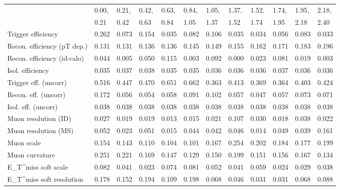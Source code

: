 \begin{tabular}{l|p{0.6cm}p{0.6cm}p{0.6cm}p{0.6cm}p{0.6cm}p{0.6cm}p{0.6cm}p{0.6cm}p{0.6cm}p{0.6cm}p{0.6cm}}
\hline
   & 0.00, & 0.21, & 0.42, & 0.63, & 0.84, & 1.05, & 1.37, & 1.52, & 1.74, & 1.95, & 2.18,  \\ 
   & 0.21 & 0.42 & 0.63 & 0.84 & 1.05 & 1.37 & 1.52 & 1.74 & 1.95 & 2.18 & 2.40  \\ 
\hline
Trigger efficiency                       & 0.262 & 0.073 & 0.154 & 0.035 & 0.082 & 0.106 & 0.035 & 0.034 & 0.056 & 0.083 & 0.033 \\
Recon. efficiency (pT dep.)              & 0.131 & 0.131 & 0.136 & 0.136 & 0.145 & 0.149 & 0.155 & 0.162 & 0.171 & 0.183 & 0.196 \\
Recon. efficiency (id-calo)              & 0.044 & 0.005 & 0.050 & 0.115 & 0.003 & 0.092 & 0.000 & 0.023 & 0.081 & 0.019 & 0.003 \\
Isol. efficiency                         & 0.035 & 0.037 & 0.038 & 0.035 & 0.035 & 0.036 & 0.036 & 0.036 & 0.037 & 0.036 & 0.036 \\
Trigger eff. (uncorr)                    & 0.516 & 0.447 & 0.470 & 0.651 & 0.662 & 0.363 & 0.413 & 0.369 & 0.364 & 0.403 & 0.424 \\
Recon. eff. (uncorr)                     & 0.172 & 0.056 & 0.054 & 0.058 & 0.091 & 0.102 & 0.057 & 0.047 & 0.057 & 0.073 & 0.071 \\
Isol. eff. (uncorr)                      & 0.038 & 0.038 & 0.038 & 0.038 & 0.038 & 0.038 & 0.038 & 0.038 & 0.038 & 0.038 & 0.038 \\
Muon resolution (ID)                     & 0.027 & 0.019 & 0.019 & 0.013 & 0.015 & 0.021 & 0.107 & 0.030 & 0.018 & 0.038 & 0.022 \\
Muon resolution (MS)                     & 0.052 & 0.023 & 0.051 & 0.015 & 0.044 & 0.042 & 0.046 & 0.014 & 0.049 & 0.039 & 0.161 \\
Muon scale                               & 0.154 & 0.143 & 0.110 & 0.104 & 0.101 & 0.167 & 0.254 & 0.202 & 0.184 & 0.177 & 0.199 \\
Muon curvature                           & 0.251 & 0.221 & 0.169 & 0.147 & 0.129 & 0.150 & 0.199 & 0.151 & 0.156 & 0.167 & 0.134 \\
E_{T}^{miss} soft scale                  & 0.082 & 0.041 & 0.023 & 0.074 & 0.081 & 0.052 & 0.041 & 0.059 & 0.024 & 0.029 & 0.038 \\
E_{T}^{miss} soft resolution             & 0.178 & 0.152 & 0.194 & 0.109 & 0.198 & 0.068 & 0.046 & 0.031 & 0.031 & 0.068 & 0.088 \\

\end{tabular}
